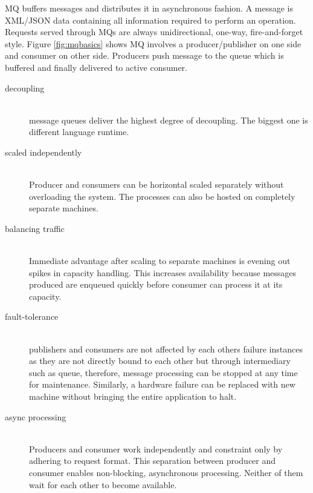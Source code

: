 \noindent
MQ buffers messages and distributes it in asynchronous fashion. A message is XML/JSON data containing
all information required to perform an operation. Requests served through MQs are always unidirectional,
one-way, fire-and-forget style. Figure \ref{fig:mqbasics} shows MQ involves a producer/publisher on one
side and consumer on other side. Producers push message to the queue which is buffered and finally
delivered to active consumer.
\begin{description}
  \item[decoupling] \hfill \\
    message queues deliver the highest degree of decoupling. The biggest one is different language
    runtime.
  \item[scaled independently] \hfill \\
    Producer and consumers can be horizontal scaled separately without overloading the system. The processes
    can also be hosted on completely separate machines.
  \item[balancing traffic] \hfill \\  
    Immediate advantage after scaling to separate machines is evening out spikes in capacity handling. This
    increases availability because messages produced are enqueued quickly before consumer can process it at
    its capacity.
  \item[fault-tolerance] \hfill \\
    publishers and consumers are not affected by each others failure instances as they are not directly
    bound to each other but through intermediary such as queue, therefore, message processing can be
    stopped at any time for maintenance. Similarly, a hardware failure can be replaced with new machine
    without bringing the entire application to halt.

    \pagebreak

  \item[async processing] \hfill \\
    Producers and consumer work independently and constraint only by adhering to request format. This
    separation between producer and consumer enables non-blocking, asynchronous processing. Neither of them
    wait for each other to become available.
\end{description}

